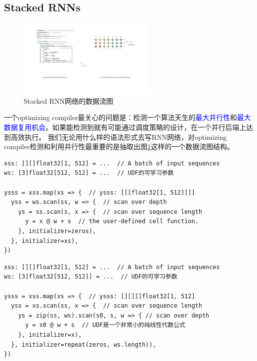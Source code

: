 

\newpage
\subsection{Stacked RNNs}

\begin{figure}[h]
  \centering
  \includegraphics[width=0.6\textwidth]{figures/signal_flow_structure_of_stacked_rnn.pdf}
  \caption{Stacked RNN网络的数据流图}\label{fig:dataflow-stacked-rnn}
\end{figure}

一个optimizing compiler最关心的问题是：检测一个算法天生的\textcolor{blue}{最大并行性}和\textcolor{blue}{最大数据复用机会}。如果能检测到就有可能通过调度策略的设计，在一个并行后端上达到高效执行。
我们无论用什么样的语法形式去写RNN网络，对optimizing compiler检测和利用并行性最重要的是抽取出图\ref{fig:dataflow-stacked-rnn}这样的一个数据流图结构。
\vspace{1em}

\begin{lstlisting}[language=fractaltensor-hello-world, caption={用parallel pattern compose stacked RNN网络}, label={stacked-rnn-code1}]
xss: [][]float32[1, 512] = ...  // A batch of input sequences
ws: [3]float32[512, 512] = ...  // UDF的可学习参数

ysss = xss.map(xs => {  // ysss: [[[float32[1, 512]]]]
  yss = ws.scan(ss, w => {  // scan over depth
    ys = ss.scan(s, x => {  // scan over sequence length
      y = x @ w + s  // the user-defined cell function.
    }, initializer=zeros),
  }, initializer=xs),
})
\end{lstlisting}

\begin{lstlisting}[language=fractaltensor-hello-world, caption={Listing \ref{stacked-rnn-code1} 的另一种语法等价形}, label={stacked-rnn-code}]
xss: [][]float32[1, 512] = ...  // A batch of input sequences
ws: [3]float32[512, 512]] = ...  // UDF的可学习参数

ysss = xss.map(xs => {  // ysss: [][][]float32[1, 512]
  yss = xs.scan(ss, x => {  // scan over sequence length
    ys = zip(ss, ws).scan(s0, s, w => { // scan over depth
      y = s0 @ w + s  // UDF是一个非常小的纯线性代数公式
    }, initializer=x),
  }, initializer=repeat(zeros, ws.length)),
})
\end{lstlisting}

